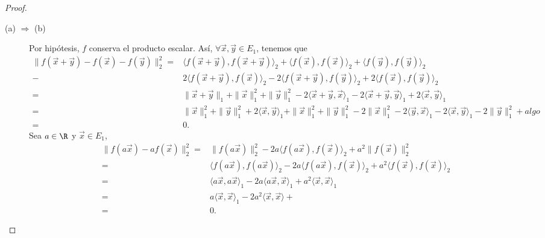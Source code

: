 \begin{proof}
\begin{description}
\item[(a) $\displaystyle \Rightarrow $ (b)] Por hipótesis, $\displaystyle f $ conserva el producto escalar. Así, $\displaystyle \forall \vec{x}, \vec{y} \in E_{1} $, tenemos que
\[
\begin{split}
	\|f\left(\vec{x} + \vec{y}\right) - f\left(\vec{x}\right) - f\left(\vec{y}\right) \|^{2}_{2} = & \langle f\left(\vec{x} + \vec{y}\right) , f\left(\vec{x} +\vec{y}\right)\rangle_{2} + \langle f\left(\vec{x}\right), f\left(\vec{x}\right)\rangle_{2} + \langle f\left(\vec{y}\right), f\left(\vec{y}\right)\rangle _{2}\\
	- & 2\langle f\left(\vec{x}+\vec{y}\right),f\left(\vec{x}\right)\rangle_{2}-2\langle f\left(\vec{x}+\vec{y}\right), f\left(\vec{y}\right)\rangle_{2}+2\langle f\left(\vec{x}\right), f\left(\vec{y}\right)\rangle_{2} \\
	= & \|\vec{x}+\vec{y}\|_{1} + \|\vec{x}\|_{1}^{2} + \|\vec{y}\|^{2}_{1}-2\langle \vec{x}+\vec{y}, \vec{x}\rangle_{1}-2\langle \vec{x}+\vec{y}, \vec{y}\rangle_{1}+2\langle \vec{x}, \vec{y}\rangle_{1} \\
	= & \|\vec{x}\|^{2}_{1} + \|\vec{y}\|^{2}_{1} + 2\langle\vec{x}, \vec{y}\rangle_{1} + \|\vec{x}\|^{2}_{1}+\|\vec{y}\|^{2}_{1}-2\|\vec{x}\|^{2}_{1}-2\langle\vec{y}, \vec{x}\rangle_{1}-2\langle\vec{x}, \vec{y}\rangle_{1}-2\|\vec{y}\|^{2}_{1} + algo\\
	= & 0.
\end{split}
\]
Sea $\displaystyle a \in \R $ y $\displaystyle \vec{x} \in E_{1} $,
	\[
	\begin{split}
		\|f\left(a\vec{x}\right)-a f\left(\vec{x}\right) \|^{2}_{2} = & \|f\left(a\vec{x}\right)\|^{2}_{2} - 2a\langle f\left(a\vec{x}\right), f\left(\vec{x}\right) \rangle_{2}+a^{2}\|f\left(\vec{x}\right)\|^{2}_{2}\\
		= & \langle f\left(a\vec{x}\right), f\left(a\vec{x}\right)\rangle_{2}-2a\langle f\left(a\vec{x}\right), f\left(\vec{x}\right)\rangle_{2} + a^{2}\langle f\left(\vec{x}\right), f\left(\vec{x}\right)\rangle_{2} \\
		= & \langle a\vec{x}, a\vec{x} \rangle _{1} - 2a\langle a \vec{x}, \vec{x} \rangle _{1} + a^{2}\langle \vec{x}, \vec{x}\rangle _{1} \\
		= & a\langle\vec{x}, \vec{x}\rangle_{1} -2a^{2}\langle\vec{x},\vec{x}\rangle +  \\
		= & 0.
	\end{split}
	\]

\end{description}
\end{proof}
